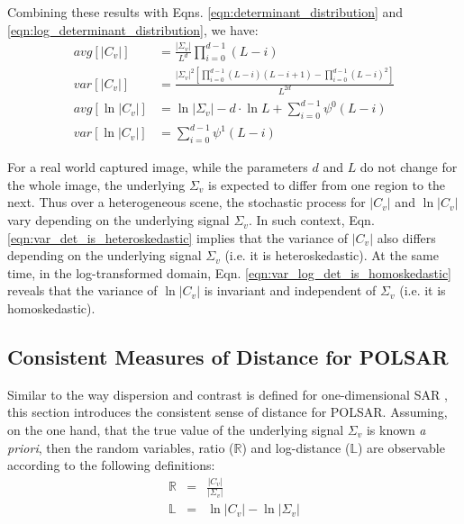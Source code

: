 \documentclass[journal,12pt,draftcls,onecolumn]{IEEEtran}
\begin{document}
Combining these results with Eqns. \ref{eqn:determinant_distribution} and \ref{eqn:log_determinant_distribution}, we have:
\begin{align}
  avg \left[ |C_v| \right]  &= \frac{|\Sigma_v|}{L^d} \prod^{d-1}_{i=0} (L-i)\\
  var \left[ |C_v| \right]  &=   \frac{|\Sigma_v|^2 \left[ \prod^{d-1}_{i=0} (L-i)(L-i+1) - \prod^{d-1}_{i=0} (L-i)^2 \right] }{L^{2d}} \label{eqn:var_det_is_heteroskedastic}\\
  avg \left[ \ln |C_v| \right] &= \ln |\Sigma_v| - d \cdot \ln{L}  + \sum^{d-1}_{i=0} \psi^0(L-i) \label{eqn:avg_log_det} \\
  var \left[ \ln |C_v| \right] &=  \sum^{d-1}_{i=0} \psi^1(L-i) \label{eqn:var_log_det_is_homoskedastic}
\end{align}

For a real world captured image, while the parameters $d$ and $L$ do not change for the whole image,
  the underlying $\Sigma_v$ is expected to differ from one region to the next.
Thus over a heterogeneous scene, the stochastic process for $|C_v|$ and $\ln |C_v|$ vary depending on the underlying signal $\Sigma_v$. 
In such context, Eqn. \ref{eqn:var_det_is_heteroskedastic} implies that the variance of $|C_v|$ also differs depending on the underlying signal $\Sigma_v$ (i.e. it is   heteroskedastic).
At the same time, in the log-transformed domain, Eqn. \ref{eqn:var_log_det_is_homoskedastic} reveals that
  the variance of $\ln |C_v|$ is invariant and independent of $\Sigma_v$ (i.e. it is homoskedastic).

\subsection{Consistent Measures of Distance for POLSAR}
\label{sec:distance_measure}

Similar to the way dispersion and contrast is defined for one-dimensional SAR \cite{Le_2010_ACRS},
  this section introduces the consistent sense of distance for POLSAR.
Assuming, on the one hand, that the true value of the underlying signal $\Sigma_v$ is known \textit{a priori},
then the random variables,
  ratio ($\mathbb{R}$) and log-distance ($\mathbb{L}$)
  are observable according to the following definitions:
\begin{eqnarray}
  \mathbb{R} &=& \frac{|C_v|}{|\Sigma_v|} \label{eqn:determinant_ratio_observables}\\
  \mathbb{L} &=& \ln|C_v| - \ln|\Sigma_v| \label{eqn:log_distance_observables} 
\end{eqnarray}
\end{document}
